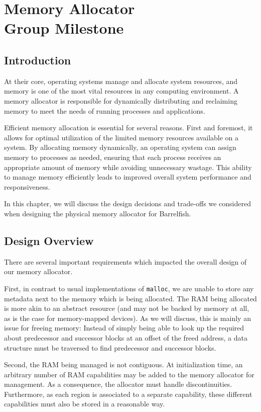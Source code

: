 \chapter[Memory Allocator]{Memory Allocator \\ \Large \textnormal{Group Milestone}}


\section{Introduction}

At their core, operating systems manage and allocate system resources, and memory is one of the most vital resources in any computing environment. A memory allocator is responsible for dynamically distributing and reclaiming memory to meet the needs of running processes and applications.

Efficient memory allocation is essential for several reasons. First and foremost, it allows for optimal utilization of the limited memory resources available on a system. By allocating memory dynamically, an operating system can assign memory to processes as needed, ensuring that each process receives an appropriate amount of memory while avoiding unnecessary wastage. This ability to manage memory efficiently leads to improved overall system performance and responsiveness.

In this chapter, we will discuss the design decisions and trade-offs we considered when designing the physical memory allocator for Barrelfish.

\section{Design Overview}
There are several important requirements which impacted the overall design of our memory allocator.

First, in contrast to usual implementations of \texttt{malloc}, we are unable to store any metadata next to the memory which is being allocated. The RAM being allocated is more akin to an abstract resource (and may not be backed by memory at all, as is the case for memory-mapped devices). As we will discuss, this is mainly an issue for freeing memory: Instead of simply being able to look up the required about predecessor and successor blocks at an offset of the freed address, a data structure must be traversed to find predecessor and successor blocks. 

Second, the RAM being managed is not contiguous. At initialization time, an arbitrary number of RAM capabilities may be added to the memory allocator for management. As a consequence, the allocator must handle discontinuities. Furthermore, as each region is associated to a separate capability, these different capabilities must also be stored in a reasonable way.

